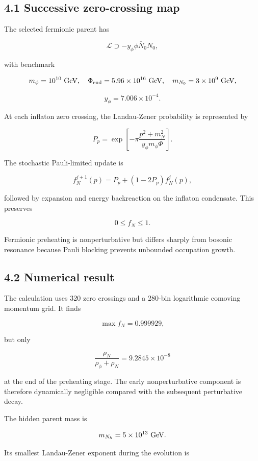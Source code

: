 \documentclass[
  10pt,
]{article}
\begin{document}
\subsection{4.1 Successive zero-crossing
map}\label{successive-zero-crossing-map}

The selected fermionic parent has

\[
\mathcal L\supset-y_\phi\phi\bar N_0N_0,
\]

with benchmark

\[
m_\phi=10^{10}\ {\rm GeV},
\quad
\Phi_{\rm end}=5.96\times10^{16}\ {\rm GeV},
\quad
m_{N_0}=3\times10^9\ {\rm GeV},
\]

\[
y_\phi=7.006\times10^{-4}.
\]

At each inflaton zero crossing, the Landau-Zener probability is
represented by

\[
P_p
=
\exp\left[
-\pi\frac{p^2+m_N^2}{y_\phi m_\phi\Phi}
\right].
\]

The stochastic Pauli-limited update is

\[
\boxed{
f_N^{j+1}(p)
=
P_p+
\left(1-2P_p\right)f_N^j(p),
}
\]

followed by expansion and energy backreaction on the inflaton
condensate. This preserves

\[
0\le f_N\le1.
\]

Fermionic preheating is nonperturbative but differs sharply from bosonic
resonance because Pauli blocking prevents unbounded occupation growth.

\subsection{4.2 Numerical result}\label{numerical-result}

The calculation uses 320 zero crossings and a 280-bin logarithmic
comoving momentum grid. It finds

\[
\max f_N=0.999929,
\]

but only

\[
\boxed{
\frac{\rho_N}{\rho_\phi+\rho_N}
=9.2845\times10^{-8}
}
\]

at the end of the preheating stage. The early nonperturbative component
is therefore dynamically negligible compared with the subsequent
perturbative decay.

The hidden parent mass is

\[
m_{N_h}=5\times10^{13}\ {\rm GeV}.
\]

Its smallest Landau-Zener exponent during the evolution is
\end{document}
